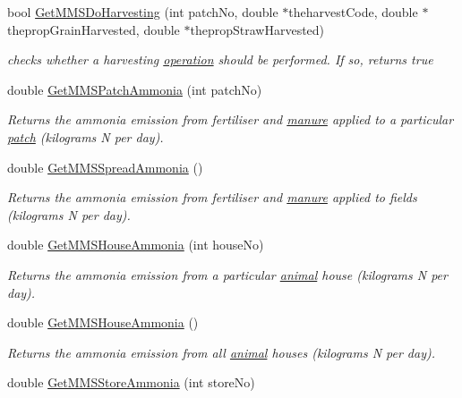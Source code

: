 \begin{DoxyCompactItemize}
bool \hyperlink{class_m_m_s_class_aa95d9e26d6a4ea7fc754aecd19d8a2bb}{GetMMSDoHarvesting} (int patchNo, double $\ast$theharvestCode, double $\ast$thepropGrainHarvested, double $\ast$thepropStrawHarvested)
\begin{DoxyCompactList}\small\item\em checks whether a harvesting \hyperlink{classoperation}{operation} should be performed. If so, returns true \item\end{DoxyCompactList}\item 
double \hyperlink{class_m_m_s_class_a8e68d4735ebf3127f1efa6fec7d6c6c9}{GetMMSPatchAmmonia} (int patchNo)
\begin{DoxyCompactList}\small\item\em Returns the ammonia emission from fertiliser and \hyperlink{classmanure}{manure} applied to a particular \hyperlink{classpatch}{patch} (kilograms N per day). \item\end{DoxyCompactList}\item 
double \hyperlink{class_m_m_s_class_a3f8f600885ab389f35329527a720caa5}{GetMMSSpreadAmmonia} ()
\begin{DoxyCompactList}\small\item\em Returns the ammonia emission from fertiliser and \hyperlink{classmanure}{manure} applied to fields (kilograms N per day). \item\end{DoxyCompactList}\item 
double \hyperlink{class_m_m_s_class_ab77575e35a1fcd15b454f96287cfbc4d}{GetMMSHouseAmmonia} (int houseNo)
\begin{DoxyCompactList}\small\item\em Returns the ammonia emission from a particular \hyperlink{classanimal}{animal} house (kilograms N per day). \item\end{DoxyCompactList}\item 
double \hyperlink{class_m_m_s_class_aef61b9a68eb4cc9df284b162516b282a}{GetMMSHouseAmmonia} ()
\begin{DoxyCompactList}\small\item\em Returns the ammonia emission from all \hyperlink{classanimal}{animal} houses (kilograms N per day). \item\end{DoxyCompactList}\item 
double \hyperlink{class_m_m_s_class_a4792c66bdc3f9b80a947d9ad83c6f708}{GetMMSStoreAmmonia} (int storeNo)

\end{DoxyCompactItemize}
